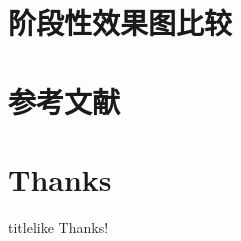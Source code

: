 \documentclass[UTF-8]{beamer}
\begin{document}
\section{阶段性效果图比较}
\frame{\sectionpage}
\begin{frame}
\end{frame}

\section{参考文献}
\begin{frame}[allowframebreaks]

\end{frame}

\section*{Thanks}
\begin{frame}
\LARGE
\begin{beamercolorbox}[center,ht=3em]{titlelike}
\vspace{1em}
Thanks!
\end{beamercolorbox}
\end{frame}
\end{document}
